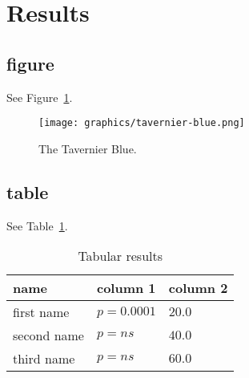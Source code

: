 % 

\section{Results}


\subsection{figure}

See Figure~\ref{fig:tavernier-blue}.

\begin{figure}[!ht]
    \centering
    {\texttt{[image: graphics/tavernier-blue.png]}}
    \caption{The Tavernier Blue.}
    \label{fig:tavernier-blue}
\end{figure}

\subsection{table}

See Table~\ref{fig:tabular-results}.

\begin{table}[htp]
\label{fig:tabular-results}
\caption{Tabular results}
\begin{tabular}{p{1.25in}p{1.25in}p{1.25in}}
\toprule
name & column 1 & column 2 \\
\midrule
first name & $p=0.0001$ & $20.0$ \\
second name & $p=ns$ & $40.0$ \\
third name & $p=ns$ & $60.0$
\end{tabular}
\end{table}
